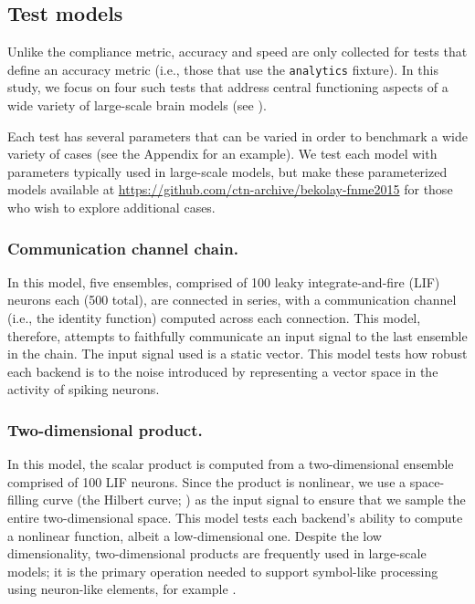 \documentclass{frontiersSCNS}
\begin{document}
\subsection{Test models}

Unlike the compliance metric,
accuracy and speed are only collected
for tests that define an accuracy metric
(i.e., those that use the \texttt{analytics} fixture).
In this study, we focus on four such tests
that address central functioning aspects
of a wide variety of large-scale brain models
(see \citealp{eliasmith2003a,eliasmith2013}).

Each test has several parameters
that can be varied
in order to benchmark a wide variety of cases
(see the Appendix for an example).
We test each model with parameters
typically used in large-scale models,
but make these parameterized models
available at \url{https://github.com/ctn-archive/bekolay-fnme2015}
for those who wish to explore additional cases.

\subsubsection{Communication channel chain.}

In this model,
five ensembles,
comprised of 100 leaky integrate-and-fire (LIF) neurons each
(500 total),
are connected in series,
with a communication channel
(i.e., the identity function)
computed across each connection.
This model, therefore, attempts to faithfully
communicate an input signal to
the last ensemble in the chain.
The input signal used is a static vector.
This model tests how
robust each backend is to the noise introduced
by representing a vector space
in the activity of spiking neurons.

\subsubsection{Two-dimensional product.}

In this model,
the scalar product is computed
from a two-dimensional ensemble
comprised of 100 LIF neurons.
Since the product is nonlinear,
we use a space-filling curve
(the Hilbert curve; \citealp{hilbert1891})
as the input signal to ensure that
we sample the entire two-dimensional space.
This model tests each backend's
ability to compute a nonlinear function,
albeit a low-dimensional one.
Despite the low dimensionality,
two-dimensional products are frequently used
in large-scale models;
it is the primary operation needed to support
symbol-like processing using neuron-like elements,
for example \citep{eliasmith2013}.
\end{document}
